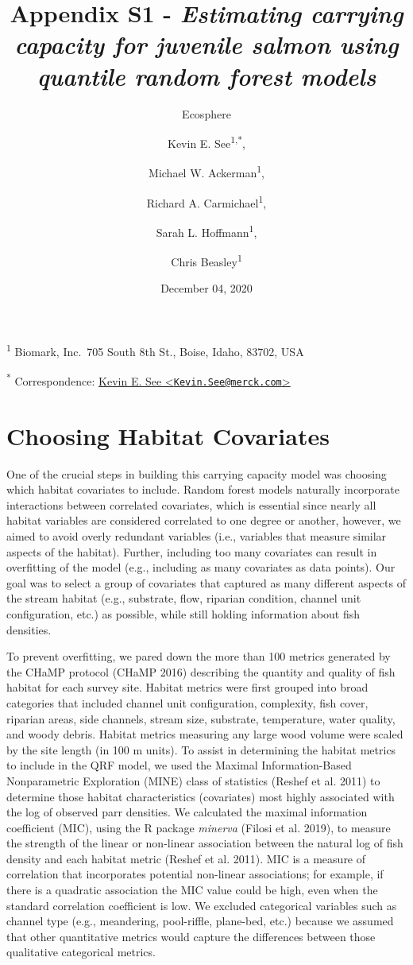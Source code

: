 \documentclass[
  12pt,
]{article}
\title{Appendix S1 - \emph{Estimating carrying capacity for juvenile salmon using quantile random forest models}}
\subtitle{Ecosphere}
\author{Kevin E. See\textsuperscript{1,*}, 
    \and Michael W. Ackerman\textsuperscript{1}, 
    \and Richard A. Carmichael\textsuperscript{1},
    \and Sarah L. Hoffmann\textsuperscript{1}, 
    \and Chris Beasley\textsuperscript{1}}
\date{December 04, 2020}
\begin{document}
\maketitle

\textsuperscript{1} Biomark, Inc.~705 South 8th St., Boise, Idaho, 83702, USA

\textsuperscript{*} Correspondence: \href{mailto:Kevin.See@merck.com}{Kevin E. See \textless{}\href{mailto:Kevin.See@merck.com}{\nolinkurl{Kevin.See@merck.com}}\textgreater{}}

\hypertarget{choosing-habitat-covariates}{%
\section{Choosing Habitat Covariates}\label{choosing-habitat-covariates}}

One of the crucial steps in building this carrying capacity model was choosing which habitat covariates to include. Random forest models naturally incorporate interactions between correlated covariates, which is essential since nearly all habitat variables are considered correlated to one degree or another, however, we aimed to avoid overly redundant variables (i.e., variables that measure similar aspects of the habitat). Further, including too many covariates can result in overfitting of the model (e.g., including as many covariates as data points). Our goal was to select a group of covariates that captured as many different aspects of the stream habitat (e.g., substrate, flow, riparian condition, channel unit configuration, etc.) as possible, while still holding information about fish densities.

To prevent overfitting, we pared down the more than 100 metrics generated by the CHaMP protocol (CHaMP 2016) describing the quantity and quality of fish habitat for each survey site. Habitat metrics were first grouped into broad categories that included channel unit configuration, complexity, fish cover, riparian areas, side channels, stream size, substrate, temperature, water quality, and woody debris. Habitat metrics measuring any large wood volume were scaled by the site length (in 100 m units). To assist in determining the habitat metrics to include in the QRF model, we used the Maximal Information-Based Nonparametric Exploration (MINE) class of statistics (Reshef et al. 2011) to determine those habitat characteristics (covariates) most highly associated with the log of observed parr densities. We calculated the maximal information coefficient (MIC), using the R package \emph{minerva} (Filosi et al. 2019), to measure the strength of the linear or non-linear association between the natural log of fish density and each habitat metric (Reshef et al. 2011). MIC is a measure of correlation that incorporates potential non-linear associations; for example, if there is a quadratic association the MIC value could be high, even when the standard correlation coefficient is low. We excluded categorical variables such as channel type (e.g., meandering, pool-riffle, plane-bed, etc.) because we assumed that other quantitative metrics would capture the differences between those qualitative categorical metrics.
\end{document}
